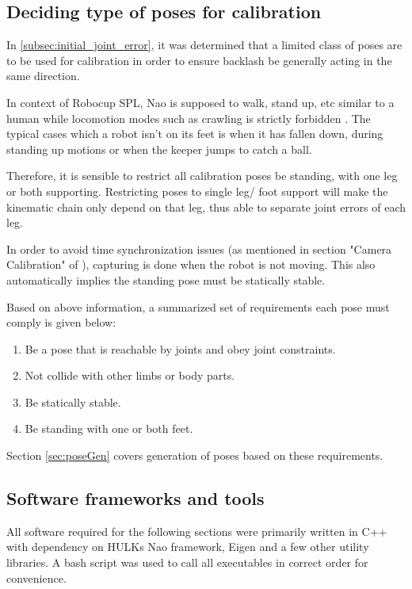 \documentclass[english, printversion, nomenclature, notitle]{tuvisionthesis} %
\begin{document}
\subsection{Deciding type of poses for calibration}

In \cref{subsec:initial_joint_error}, it was determined that a limited class of poses are to be used for calibration in order to ensure backlash be generally acting in the same direction.

In context of Robocup SPL, Nao is supposed to walk, stand up, etc similar to a human while locomotion modes such as crawling is strictly forbidden \cite{robocup_technical_committee_robocup_2018}. The typical cases which a robot isn't on its feet is when it has fallen down, during standing up motions or when the keeper jumps to catch a ball.

Therefore, it is sensible to restrict all calibration poses be standing, with one leg or both supporting. Restricting poses to single leg/ foot support will make the kinematic chain only depend on that leg, thus able to separate joint errors of each leg.

In order to avoid time synchronization issues (as mentioned in section "Camera Calibration" of \cite{darshana_adikari_team_2017}), capturing is done when the robot is not moving. This also automatically implies the standing pose must be statically stable.

Based on above information, a summarized set of requirements each pose must comply is given below:
\begin{enumerate}
	\label{items:conditionsForPose}
	\item Be a pose that is reachable by joints and obey joint constraints.
	\item Not collide with other limbs or body parts.
	\item Be statically stable.
	\item Be standing with one or both feet.
\end{enumerate}

Section \ref{sec:poseGen} covers generation of poses based on these requirements.

\subsection{Software frameworks and tools}

All software required for the following sections were primarily written in C++ with dependency on HULKs Nao framework, Eigen and a few other utility libraries. A bash script was used to call all executables in correct order for convenience.
\end{document}
